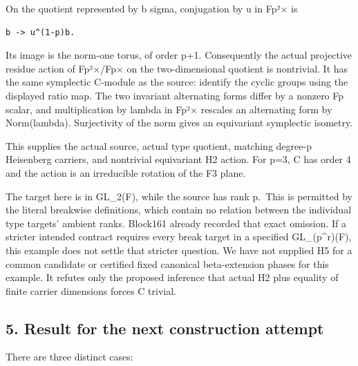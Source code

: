 On the quotient represented by b sigma, conjugation by u in Fp²× is

\begin{Verbatim}[fontsize=\small,breaklines=true,breakanywhere=true]
b -> u^(1-p)b.
\end{Verbatim}

Its image is the norm-one torus, of order p+1. Consequently the actual
projective residue action of Fp²×/Fp× on the two-dimensional quotient is
nontrivial. It has the same symplectic C-module as the source: identify
the cyclic groups using the displayed ratio map. The two invariant
alternating forms differ by a nonzero Fp scalar, and multiplication by
lambda in Fp²× rescales an alternating form by Norm(lambda).
Surjectivity of the norm gives an equivariant symplectic isometry.

This supplies the actual source, actual type quotient, matching degree-p
Heisenberg carriers, and nontrivial equivariant H2 action. For p=3, C
has order 4 and the action is an irreducible rotation of the F3 plane.

The target here is in GL\_2(F), while the source has rank p.~This is
permitted by the literal breakwise definitions, which contain no
relation between the individual type targets' ambient ranks. Block161
already recorded that exact omission. If a stricter intended contract
requires every break target in a specified GL\_(p\^{}r)(F), this example
does not settle that stricter question. We have not supplied H5 for a
common candidate or certified fixed canonical beta-extension phases for
this example. It refutes only the proposed inference that actual H2 plus
equality of finite carrier dimensions forces C trivial.

\hypertarget{stabilizer_contract-result-for-the-next-construction-attempt}{%
\subsection{5. Result for the next construction
attempt}\label{stabilizer_contract-result-for-the-next-construction-attempt}}

There are three distinct cases:

